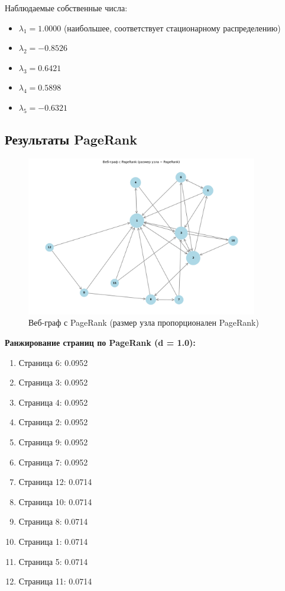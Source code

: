 Наблюдаемые собственные числа:
\begin{itemize}
    \item $\lambda_1 = 1.0000$ (наибольшее, соответствует стационарному распределению)
    \item $\lambda_2 = -0.8526$
    \item $\lambda_3 = 0.6421$
    \item $\lambda_4 = 0.5898$
    \item $\lambda_5 = -0.6321$
\end{itemize}

\subsection*{Результаты PageRank}

\begin{figure}[H]
    \centering
    \includegraphics[width=0.9\textwidth]{images/task2/pagerank_result.png}
    \caption{Веб-граф с PageRank (размер узла пропорционален PageRank)}
\end{figure}

\textbf{Ранжирование страниц по PageRank (d = 1.0):}
\begin{enumerate}
    \item Страница 6: 0.0952
    \item Страница 3: 0.0952
    \item Страница 4: 0.0952
    \item Страница 2: 0.0952
    \item Страница 9: 0.0952
    \item Страница 7: 0.0952
    \item Страница 12: 0.0714
    \item Страница 10: 0.0714
    \item Страница 8: 0.0714
    \item Страница 1: 0.0714
    \item Страница 5: 0.0714
    \item Страница 11: 0.0714
\end{enumerate}

